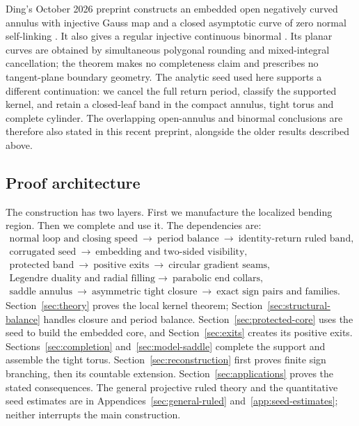 \documentclass[11pt]{amsart}
\theoremstyle{definition}
\theoremstyle{remark}
\numberwithin{equation}{section}
\begin{document}
Ding's October 2026 preprint constructs an embedded open negatively
curved annulus with injective Gauss map and a closed asymptotic curve
of zero normal self-linking \cite[Theorem~1.1]{Ding2026}. It also gives
a regular injective continuous binormal \cite[Corollary~1.2]{Ding2026}.
Its planar curves are obtained by simultaneous polygonal rounding and
mixed-integral cancellation; the theorem makes no completeness claim
and prescribes no tangent-plane boundary geometry. The analytic seed
used here supports a different continuation: we cancel the full return
period, classify the supported kernel, and retain a closed-leaf band in
the compact annulus, tight torus and complete cylinder. The overlapping
open-annulus and binormal conclusions are therefore also stated in
this recent preprint, alongside the older results described above.

\subsection{Proof architecture}
The construction has two layers. First we manufacture the localized
bending region. Then we complete and use it. The dependencies are:
\[
 \begin{gathered}
 \text{normal loop and closing speed}
 \ \longrightarrow\ \text{period balance}
 \ \longrightarrow\ \text{identity-return ruled band},\\
 \text{corrugated seed}
 \ \longrightarrow\ \text{embedding and two-sided visibility},\\
 \text{protected band}
 \ \longrightarrow\ \text{positive exits}
 \ \longrightarrow\ \text{circular gradient seams},\\
 \text{Legendre duality and radial filling}
 \longrightarrow\ \text{parabolic end collars},\\
 \text{saddle annulus}
 \ \longrightarrow\ \text{asymmetric tight closure}
 \ \longrightarrow\ \text{exact sign pairs and families}.
 \end{gathered}
\]
Section~\ref{sec:theory} proves the local kernel theorem;
Section~\ref{sec:structural-balance} handles closure and period balance.
Section~\ref{sec:protected-core} uses the seed to build the embedded core,
and Section~\ref{sec:exits} creates its positive exits.
Sections~\ref{sec:completion} and~\ref{sec:model-saddle} complete the
support and assemble the tight torus. Section~\ref{sec:reconstruction}
first proves finite sign branching, then its countable extension.
Section~\ref{sec:applications} proves the stated consequences.
The general projective ruled theory and the quantitative seed estimates
are in Appendices~\ref{sec:general-ruled} and~\ref{app:seed-estimates};
neither interrupts the main construction.
\end{document}
